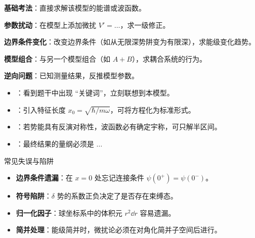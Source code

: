 \begin{drillbox}[训练点与考法变体]
 \textbf{基础考法}：直接求解该模型的能谱或波函数。

 \textbf{参数扰动}：在模型上添加微扰 $V' = \dots$，求一级修正。

 \textbf{边界条件变化}：改变边界条件（如从无限深势阱变为有限深），求能级变化趋势。

 \textbf{模型组合}：与另一个模型组合（如 $A+B$），求耦合系统的行为。

 \textbf{逆向问题}：已知测量结果，反推模型参数。
\end{drillbox}

\begin{tipbox}[快速识别与解题技巧]
\begin{itemize}
    \item {}：看到题干中出现 ``关键词''，立刻联想到本模型。
    \item {}：引入特征长度 $x_0 = \sqrt{\hbar/m\omega}$，可将方程化为标准形式。
    \item {}：若势能具有反演对称性，波函数必有确定宇称，可只解半区间。
    \item {}：最终结果的量纲必须是 $\dots$
\end{itemize}
\end{tipbox}

\begin{errorbox}{常见失误与陷阱}
\begin{itemize}
    \item \textbf{边界条件遗漏}：在 $x=0$ 处忘记连接条件 $\psi(0^+)=\psi(0^-)$。
    \item \textbf{符号陷阱}：$\delta$ 势的系数正负决定了是否存在束缚态。
    \item \textbf{归一化因子}：球坐标系中的体积元 $r^2\dd r$ 容易遗漏。
    \item \textbf{简并处理}：能级简并时，微扰论必须在对角化简并子空间后进行。
\end{itemize}
\end{errorbox}

